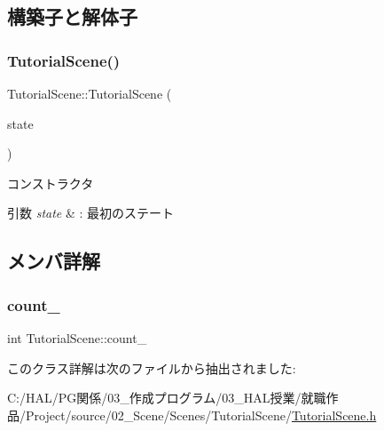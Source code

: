 \subsection{構築子と解体子}
\mbox{\label{class_tutorial_scene_ad4cae04d2651e485f7f7233f4fd810a7}} 
\subsubsection{\texorpdfstring{Tutorial\+Scene()}{TutorialScene()}}
{\footnotesize\ttfamily Tutorial\+Scene\+::\+Tutorial\+Scene (\begin{DoxyParamCaption}\item[{\mbox{\hyperlink{class_scene_bace_1_1_state_abstract}{State\+Abstract}} $\ast$}]{state }\end{DoxyParamCaption})\hspace{0.3cm}{\ttfamily [inline]}}



コンストラクタ 


\begin{DoxyParams}{引数}
{\em state} & \+: 最初のステート \\
\hline
\end{DoxyParams}


\subsection{メンバ詳解}
\mbox{\label{class_tutorial_scene_a8db8cdfb7bf91dbab3353cfb54593bf9}} 
\subsubsection{\texorpdfstring{count\+\_\+}{count\_}}
{\footnotesize\ttfamily int Tutorial\+Scene\+::count\+\_\+}



このクラス詳解は次のファイルから抽出されました\+:\begin{DoxyCompactItemize}
\item 
C\+:/\+H\+A\+L/\+P\+G関係/03\+\_\+作成プログラム/03\+\_\+\+H\+A\+L授業/就職作品/\+Project/source/02\+\_\+\+Scene/\+Scenes/\+Tutorial\+Scene/\mbox{\hyperlink{_tutorial_scene_8h}{Tutorial\+Scene.\+h}}\end{DoxyCompactItemize}
